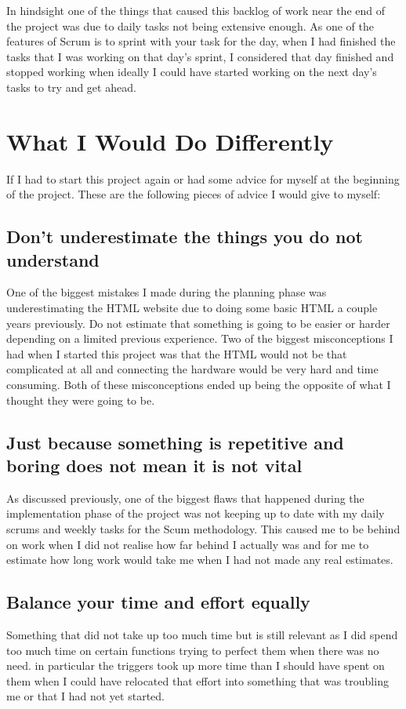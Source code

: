 In hindsight one of the things that caused this backlog of work near the end of the project was due to daily tasks not being extensive enough. As one of the features of Scrum is to sprint with your task for the day, when I had finished the tasks that I was working on that day’s sprint, I considered that day finished and stopped working when ideally I could have started working on the next day’s tasks to try and get ahead. 

\section {What I Would Do Differently}
If I had to start this project again or had some advice for myself at the beginning of the project. These are the following pieces of advice I would give to myself: 

\subsection{Don’t underestimate the things you do not understand}
One of the biggest mistakes I made during the planning phase was underestimating the HTML website due to doing some basic HTML a couple years previously. Do not estimate that something is going to be easier or harder depending on a limited previous experience. Two of the biggest misconceptions I had when I started this project was that the HTML would not be that complicated at all and connecting the hardware would be very hard and time consuming. Both of these misconceptions ended up being the opposite of what I thought they were going to be. 

\subsection{Just because something is repetitive and boring does not mean it is not vital}
As discussed previously, one of the biggest flaws that happened during the implementation phase of the project was not keeping up to date with my daily scrums and weekly tasks for the Scum methodology. This caused me to be behind on work when I did not realise how far behind I actually was and for me to estimate how long work would take me when I had not made any real estimates.

\subsection{Balance your time and effort equally}
Something that did not take up too much time but is still relevant as I did spend too much time on certain functions trying to perfect them when there was no need. in particular the triggers took up more time than I should have spent on them when I could have relocated that effort into something that was troubling me or that I had not yet started. 

